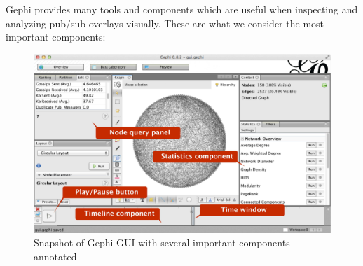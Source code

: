 Gephi provides many tools and components which are useful when
inspecting and analyzing pub/sub overlays visually. These are what we
consider the most important components:

\begin{figure}[h]
    \centering
    \includegraphics[width=\textwidth]{figures/gui_ann}
    \caption{Snapshot of Gephi GUI with several important components
        annotated}
\end{figure}


